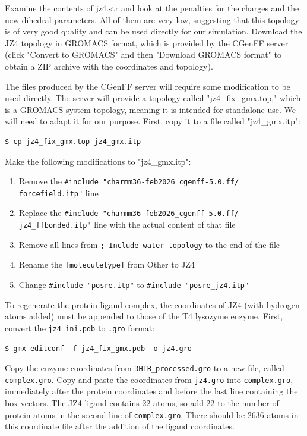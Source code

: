 \documentclass[9pt,tutorial,pubversion]{livecoms}
\begin{document}
Examine the contents of jz4.str and look at the penalties for the charges and the new dihedral parameters. All of them are very low, suggesting that this topology is of very good quality and can be used directly for our simulation. Download the JZ4 topology in GROMACS format, which is provided by the CGenFF server (click "Convert to GROMACS" and then "Download GROMACS format" to obtain a ZIP archive with the coordinates and topology).

The files produced by the CGenFF server will require some modification to be used directly. The server will provide a topology called "jz4\_fix\_gmx.top," which is a GROMACS system topology, meaning it is intended for standalone use. We will need to adapt it for our purpose. First, copy it to a file called "jz4\_gmx.itp":

\begin{lstlisting}
$ cp jz4_fix_gmx.top jz4_gmx.itp
\end{lstlisting}

Make the following modifications to "jz4\_gmx.itp":

\begin{enumerate}
	\item Remove the \texttt{\#include "charmm36-feb2026\_cgenff-5.0.ff/\\forcefield.itp"} line
	\item Replace the \texttt{\#include "charmm36-feb2026\_cgenff-5.0.ff/\\jz4\_ffbonded.itp"} line with the actual content of that file
	\item Remove all lines from \texttt{; Include water topology} to the end of the file
	\item Rename the \texttt{[moleculetype]} from Other to JZ4
	\item Change \texttt{\#include "posre.itp"} to \texttt{\#include "posre\_jz4.itp"}
\end{enumerate}

To regenerate the protein-ligand complex, the coordinates of JZ4 (with hydrogen atoms added) must be appended to those of the T4 lysozyme enzyme. First, convert the \texttt{jz4\_ini.pdb} to \texttt{.gro} format:

\begin{lstlisting}
$ gmx editconf -f jz4_fix_gmx.pdb -o jz4.gro
\end{lstlisting}

Copy the enzyme coordinates from \texttt{3HTB\_processed.gro} to a new file, called \texttt{complex.gro}. Copy and paste the coordinates from \texttt{jz4.gro} into \texttt{complex.gro}, immediately after the protein coordinates and before the last line containing the box vectors. The JZ4 ligand contains 22 atoms, so add 22 to the number of protein atoms in the second line of \texttt{complex.gro}. There should be 2636 atoms in this coordinate file after the addition of the ligand coordinates.
\end{document}
